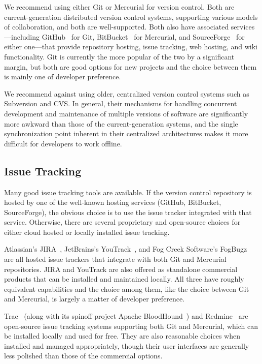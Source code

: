 We recommend using either Git or Mercurial for version control. Both
are current-generation distributed version control systems, supporting
various models of collaboration, and both are well-supported. Both
also have associated services---including GitHub~\cite{GitHub} for
Git, BitBucket~\cite{BitBucket} for Mercurial, and
SourceForge~\cite{SourceForge} for either one---that provide
repository hosting, issue tracking, web hosting, and wiki
functionality. Git is currently the more popular of the two by a
significant margin, but both are good options for new projects and the
choice between them is mainly one of developer preference.

We recommend against using older, centralized version control systems
such as Subversion and CVS. In general, their mechanisms for handling
concurrent development and maintenance of multiple versions of
software are significantly more awkward than those of the
current-generation systems, and the single synchronization point
inherent in their centralized architectures makes it more difficult
for developers to work offline.

\subsection{Issue Tracking}

Many good issue tracking tools are available. If the version control
repository is hosted by one of the well-known hosting services
(GitHub, BitBucket, SourceForge), the obvious choice is to use the
issue tracker integrated with that service. Otherwise, there are
several proprietary and open-source choices for either cloud hosted or
locally installed issue tracking.

Atlassian's JIRA~\cite{JIRA}, JetBrains's YouTrack~\cite{YouTrack},
and Fog Creek Software's FogBugz~\cite{FogBugz} are all hosted issue
trackers that integrate with both Git and Mercurial repositories. JIRA
and YouTrack are also offered as standalone commercial products that
can be installed and maintained locally. All three have roughly
equivalent capabilities and the choice among them, like the choice
between Git and Mercurial, is largely a matter of developer
preference.

Trac~\cite{Trac} (along with its spinoff project Apache
BloodHound~\cite{ApacheBloodhound}) and Redmine~\cite{Redmine} are
open-source issue tracking systems supporting both Git and Mercurial,
which can be installed locally and used for free. They are also
reasonable choices when installed and managed appropriately, though
their user interfaces are generally less polished than those of the
commercial options.


